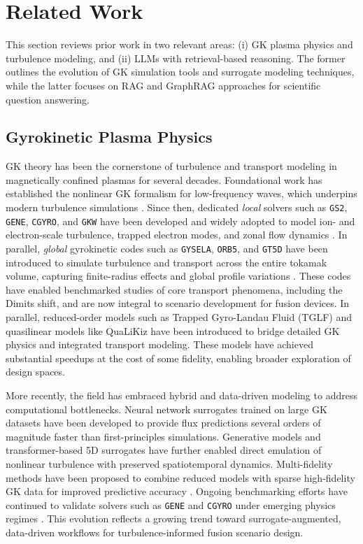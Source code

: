 \documentclass[journal]{IEEEtran}
\begin{document}
\section{Related Work}

This section reviews prior work in two relevant areas: (i) GK plasma physics and turbulence modeling, and (ii) LLMs with retrieval-based reasoning. The former outlines the evolution of GK simulation tools and surrogate modeling techniques, while the latter focuses on RAG and GraphRAG approaches for scientific question answering.

\subsection{Gyrokinetic Plasma Physics}

GK theory has been the cornerstone of turbulence and transport modeling in magnetically confined plasmas for several decades. Foundational work has established the nonlinear GK formalism for low-frequency waves, which underpins modern turbulence simulations \cite{frieman1982nonlinear}. {Since then, dedicated \emph{local} solvers such as \texttt{GS2}, \texttt{GENE}, \texttt{CGYRO}, and \texttt{GKW} have been developed and widely adopted to model ion- and electron-scale turbulence, trapped electron modes, and zonal flow dynamics \cite{jenko2000electron, candy2016high}. In parallel, \emph{global} gyrokinetic codes such as \texttt{GYSELA}, \texttt{ORB5}, and \texttt{GT5D} have been introduced to simulate turbulence and transport across the entire tokamak volume, capturing finite-radius effects and global profile variations \cite{donnel2019multi}.} These codes have enabled benchmarked studies of core transport phenomena, including the Dimits shift, and are now integral to scenario development for fusion devices. In parallel, reduced-order models such as Trapped Gyro-Landau Fluid (TGLF) \cite{staebler2007theory} and quasilinear models like QuaLiKiz \cite{garbet2010gyrokinetic} have been introduced to bridge detailed GK physics and integrated transport modeling. These models have achieved substantial speedups at the cost of some fidelity, enabling broader exploration of design spaces.

More recently, the field has embraced hybrid and data-driven modeling to address computational bottlenecks. Neural network surrogates trained on large GK datasets \cite{candy2016high} have been developed to provide flux predictions several orders of magnitude faster than first-principles simulations. Generative models \cite{clavier2025generative} and transformer-based 5D surrogates \cite{galletti20255d} have further enabled direct emulation of nonlinear turbulence with preserved spatiotemporal dynamics. Multi-fidelity methods have been proposed to combine reduced models with sparse high-fidelity GK data for improved predictive accuracy \cite{maeyama2024multi}. Ongoing benchmarking efforts have continued to validate solvers such as \texttt{GENE} and \texttt{CGYRO} under emerging physics regimes \cite{kim2024verification}. This evolution reflects a growing trend toward surrogate-augmented, data-driven workflows for turbulence-informed fusion scenario design.
\end{document}
